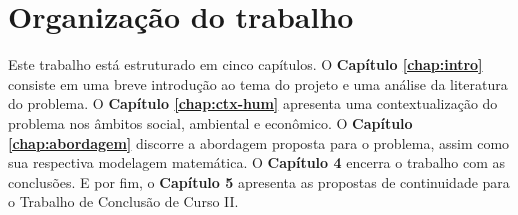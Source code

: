 \section{Organização do trabalho} %
\label{sec:organização_do_trabalho}
Este trabalho está estruturado em cinco capítulos. O \textbf{Capítulo \ref{chap:intro}} consiste em uma breve introdução ao tema do projeto e uma análise da literatura do problema. O \textbf{Capítulo \ref{chap:ctx-hum}} apresenta uma contextualização do problema nos âmbitos social, ambiental e econômico. O \textbf{Capítulo \ref{chap:abordagem}} discorre a abordagem proposta para o problema, assim como sua respectiva modelagem matemática. O \textbf{Capítulo 4} encerra o trabalho com as conclusões. E por fim, o \textbf{Capítulo 5} apresenta as propostas de continuidade para o Trabalho de Conclusão de Curso II.




